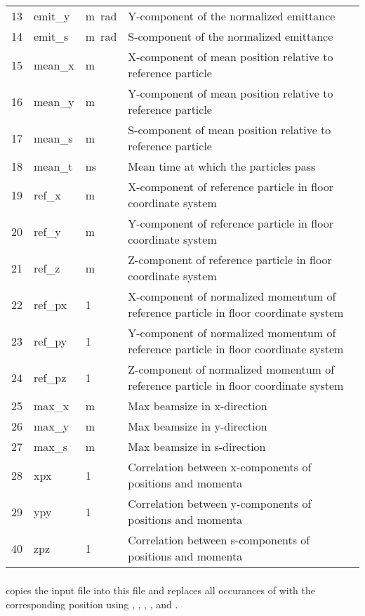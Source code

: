 \begin{center}
\begin{longtable}{p{1.5cm}p{1.7cm}p{1.3cm}p{9.5cm}}
13 & emit\_y & \si{\meter\radian} & Y-component of the normalized emittance\\
14 & emit\_s & \si{\meter\radian} & S-component of the normalized emittance\\
15 & mean\_x & \si{\meter} & X-component of mean position relative to reference particle\\
16 & mean\_y & \si{\meter} & Y-component of mean position relative to reference particle\\
17 & mean\_s & \si{\meter} & S-component of mean position relative to reference particle\\
18 & mean\_t & \si{\nano\second} & Mean time at which the particles pass\\
19 & ref\_x & \si{\meter} & X-component of reference particle in floor coordinate system\\
20 & ref\_y & \si{\meter} & Y-component of reference particle in floor coordinate system\\
21 & ref\_z & \si{\meter} & Z-component of reference particle in floor coordinate system\\
22 & ref\_px & 1 & X-component of normalized momentum of reference particle in floor coordinate system\\
23 & ref\_py & 1 & Y-component of normalized momentum of reference particle in floor coordinate system\\
24 & ref\_pz & 1 & Z-component of normalized momentum of reference particle in floor coordinate system\\
25 & max\_x & \si{\meter} & Max beamsize in x-direction\\
26 & max\_y & \si{\meter} & Max beamsize in y-direction\\
27 & max\_s & \si{\meter} & Max beamsize in s-direction\\
28 & xpx & 1 & Correlation between x-components of positions and momenta\\
29 & ypy & 1 & Correlation between y-components of positions and momenta\\
40 & zpz & 1 & Correlation between s-components of positions and momenta\\
\end{longtable}
\end{center}

\subsubsection*{}
\opalt copies the input file into this file and replaces all occurances of  with the corresponding position using , , , ,  and .

